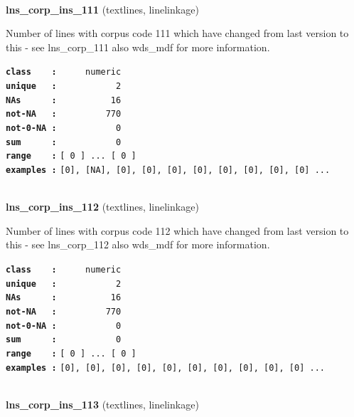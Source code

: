 \documentclass[]{article}
\begin{document}
~

\textbf{lns\_corp\_ins\_111} (textlines, linelinkage)

Number of lines with corpus code 111 which have changed from last
version to this - see lns\_corp\_111 also wds\_mdf for more information.

\textbf{\texttt{class\ \ \ \ :}} \texttt{~~~~~numeric}\\
\textbf{\texttt{unique\ \ \ :}} \texttt{~~~~~~~~~~~2}\\
\textbf{\texttt{NAs\ \ \ \ \ \ :}} \texttt{~~~~~~~~~~16}\\
\textbf{\texttt{not-NA\ \ \ :}} \texttt{~~~~~~~~~770}\\
\textbf{\texttt{not-0-NA\ :}} \texttt{~~~~~~~~~~~0}\\
\textbf{\texttt{sum\ \ \ \ \ \ :}} \texttt{~~~~~~~~~~~0}\\
\textbf{\texttt{range\ \ \ \ :}}
\texttt{{[}\ 0\ {]}\ ...\ {[}\ 0\ {]}}\\
\textbf{\texttt{examples\ :}}
\texttt{{[}0{]},\ {[}NA{]},\ {[}0{]},\ {[}0{]},\ {[}0{]},\ {[}0{]},\ {[}0{]},\ {[}0{]},\ {[}0{]},\ {[}0{]}\ ...}\\

~

\textbf{lns\_corp\_ins\_112} (textlines, linelinkage)

Number of lines with corpus code 112 which have changed from last
version to this - see lns\_corp\_112 also wds\_mdf for more information.

\textbf{\texttt{class\ \ \ \ :}} \texttt{~~~~~numeric}\\
\textbf{\texttt{unique\ \ \ :}} \texttt{~~~~~~~~~~~2}\\
\textbf{\texttt{NAs\ \ \ \ \ \ :}} \texttt{~~~~~~~~~~16}\\
\textbf{\texttt{not-NA\ \ \ :}} \texttt{~~~~~~~~~770}\\
\textbf{\texttt{not-0-NA\ :}} \texttt{~~~~~~~~~~~0}\\
\textbf{\texttt{sum\ \ \ \ \ \ :}} \texttt{~~~~~~~~~~~0}\\
\textbf{\texttt{range\ \ \ \ :}}
\texttt{{[}\ 0\ {]}\ ...\ {[}\ 0\ {]}}\\
\textbf{\texttt{examples\ :}}
\texttt{{[}0{]},\ {[}0{]},\ {[}0{]},\ {[}0{]},\ {[}0{]},\ {[}0{]},\ {[}0{]},\ {[}0{]},\ {[}0{]},\ {[}0{]}\ ...}\\

~

\textbf{lns\_corp\_ins\_113} (textlines, linelinkage)
\end{document}
